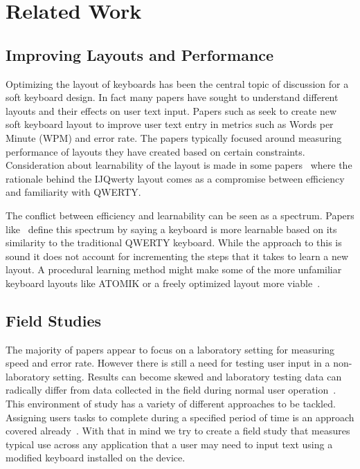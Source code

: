 \section{Related Work}



\subsection{Improving Layouts and Performance}

Optimizing the layout of keyboards has been the central topic of discussion for a soft keyboard design. In fact many papers have sought to understand different layouts and their effects on user text input. Papers such as \cite{Bi:2010:QSK:1753326.1753367, Bi:2016:IDO:2858036.2858421, Oulasvirta:2013:ITT:2470654.2481383}  seek to create new soft keyboard layout to improve user text entry in metrics such as Words per Minute (WPM) and error rate. The papers typically focused around measuring performance of layouts they have created based on certain constraints. Consideration about learnability of the layout is made in some papers~\cite{Bi:2016:IDO:2858036.2858421} where the rationale behind the IJQwerty layout comes as a compromise between efficiency and familiarity with QWERTY.

The conflict between efficiency and learnability can be seen as a spectrum. Papers like~\cite{Bi:2016:IDO:2858036.2858421} define this spectrum by saying a keyboard is more learnable based on its similarity to the traditional QWERTY keyboard. While the approach to this is sound it does not account for incrementing the steps that it takes to learn a new layout. A procedural learning method might make some of the more unfamiliar keyboard layouts like ATOMIK or a freely optimized layout more viable~\cite{Bi:2010:QSK:1753326.1753367}.

\subsection{Field Studies}

The majority of papers appear to focus on a laboratory setting for measuring speed and error rate. However there is still a need for testing user input in a non-laboratory setting. Results can become skewed and laboratory testing data can radically differ from data collected in the field during normal user operation~\cite{reyal2015performance}. This environment of study has a variety of different approaches to be tackled. Assigning users tasks to complete during a specified period of time is an approach covered already~\cite{reyal2015performance}. With that in mind we try to create a field study that measures typical use across any application that a user may need to input text using a modified keyboard installed on the device.

